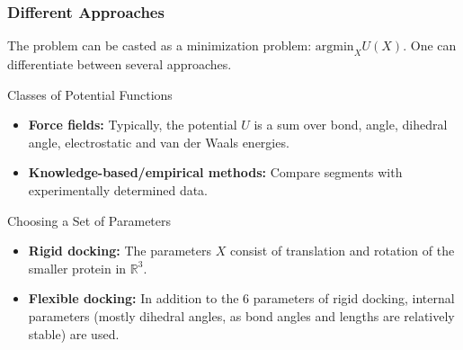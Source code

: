 \documentclass{beamer}
\begin{document}
\begin{frame}
\begin{columns}
{\begin{figure}
\end{figure}
}
\end{columns}

\end{frame}


\begin{frame}
\frametitle{Different Approaches}
The problem can be casted as a minimization problem: $\text{argmin}_{X} U(X)$. One can differentiate between several approaches.
\begin{block}{Classes of Potential Functions}
\begin{itemize}
	\item \textbf{Force fields:} Typically, the potential $U$ is a sum over bond, angle, dihedral angle, electrostatic and van der Waals energies.
	\item \textbf{Knowledge-based/empirical methods:} Compare segments with experimentally determined data.
\end{itemize}
\end{block}

\begin{block}{Choosing a Set of Parameters}
\begin{itemize}
	\item \textbf{Rigid docking:} The parameters $X$ consist of translation and rotation of the smaller protein in $\mathbb R^3$.
	\item \textbf{Flexible docking:} In addition to the 6 parameters of rigid docking, internal parameters (mostly dihedral angles, as bond angles and lengths are relatively stable) are used.
\end{itemize}
\end{block}

\end{frame}

\end{document}

